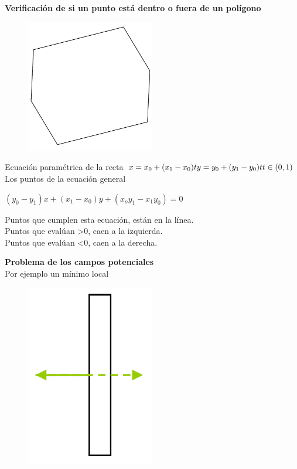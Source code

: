 \textbf{Verificación de si un punto está dentro o fuera de un polígono}

\begin{figure}[h!]
	\centering
	\includegraphics[width=0.5\textwidth]{images/img70.png}
	\label{figura70}
\end{figure}
	\break

Ecuación paramétrica de la recta
$
x = x_0 + (x_1 - x_0)t \\
y = y_0 + (y_1 - y_0)t \\
t \in (0,1)
$
Los puntos de la ecuación general

$
(y_0 - y_1)x + (x_1 - x_0)y + (x_oy_1 - x_1y_0) = 0
$

Puntos que cumplen esta ecuación, están en la línea.
\\ Puntos que evalúan >0, caen a la izquierda. \\ Puntos que evalúan <0, caen a la derecha.

\textbf{Problema de los campos potenciales}
\\ Por ejemplo un mínimo local

\begin{figure}[h!]
	\centering
	\includegraphics[width=0.5\textwidth]{images/img71.png}
	\label{figura71}
\end{figure}
\break


